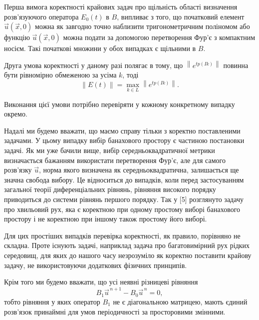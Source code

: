 \begin{remark}
    Перша вимога коректності крайових задач про щільність області визначення розв'язуючого оператора $E_0(t)$ в $B$, випливає з того, що початковий елемент $\vec u \left( \vec x, 0 \right)$ можна як завгодно точно наблизити тригонометричним поліномом або функцію $\vec u \left( \vec x, 0 \right)$ можна подати за допомогою перетворення Фур'є з компактним носієм. Такі початкові множини у обох випадках є щільними в $B$. \medskip

	Друга умова коректності у даному разі полягає в тому, що $\left\| e^{t p(I k)} \right\|$ повинна бути рівномірно обмеженою за усіма $k$, тоді
	\begin{equation*}
	    \|E(t)\| = \max_{k \in L} \left\| e^{t p(I k)} \right\|.
	\end{equation*}

    Виконання цієї умови потрібно перевіряти у кожному конкретному випадку окремо.
\end{remark}

Надалі ми будемо вважати, що маємо справу тільки з коректно поставленими задачами. У цьому випадку вибір банахового простору є частиною постановки задачі. Як ми уже бачили вище, вибір середньоквадратичної метрики визначається бажанням використати перетворення Фур'є, але для самого розв'язку $\vec u$, норма якого визначена як середньоквадратична, залишається ще значна свобода вибору. Це відноситься до випадків, коли перед застосуванням загальної теорії диференціальних рівнянь, рівняння високого порядку приводиться до системи рівнянь першого порядку. Так у [5] розглянуто задачу про хвильовий рух, яка є коректною при одному простому виборі банахового простору і не коректною при іншому також простому його виборі. \medskip

Для цих простіших випадків перевірка коректності, як правило, порівняно не складна. Проте існують задачі, наприклад задача про багатовимірний рух рідких середовищ, для яких до нашого часу незрозуміло як коректно поставити крайову задачу, не використовуючи додаткових фізичних принципів.

Крім того ми будемо вважати, що усі неявні різницеві рівняння 
\begin{equation*}
    B_1 \vec u^{\,n + 1} - B_0 \vec u^{\,n} = 0,
\end{equation*}
тобто рівняння у яких оператор $B_1$ не є діагональною матрицею, мають єдиний розв'язок принаймні для умов періодичності за просторовими змінними.

